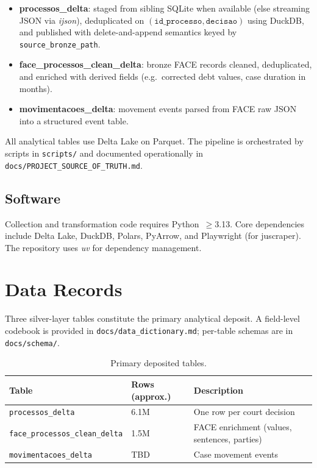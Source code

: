 \documentclass[11pt,a4paper]{article}
\begin{document}
\begin{itemize}
  \item \textbf{processos\_delta}: staged from sibling SQLite when available (else streaming JSON via \emph{ijson}), deduplicated on \((\texttt{id\_processo}, \texttt{decisao})\) using DuckDB, and published with delete-and-append semantics keyed by \texttt{source\_bronze\_path}.
  \item \textbf{face\_processos\_clean\_delta}: bronze FACE records cleaned, deduplicated, and enriched with derived fields (e.g.\ corrected debt values, case duration in months).
  \item \textbf{movimentacoes\_delta}: movement events parsed from FACE raw JSON into a structured event table.
\end{itemize}

All analytical tables use Delta Lake on Parquet. The pipeline is orchestrated by scripts in \texttt{scripts/} and documented operationally in \texttt{docs/PROJECT\_SOURCE\_OF\_TRUTH.md}.

\subsection*{Software}

Collection and transformation code requires Python~$\geq$3.13. Core dependencies include Delta Lake, DuckDB, Polars, PyArrow, and Playwright (for juscraper). The repository uses \emph{uv} for dependency management.

\section*{Data Records}

Three silver-layer tables constitute the primary analytical deposit. A field-level codebook is provided in \texttt{docs/data\_dictionary.md}; per-table schemas are in \texttt{docs/schema/}.

\begin{table}[htbp]
  \centering
  \caption{Primary deposited tables.}
  \label{tab:tables}
  \begin{tabular}{@{}lll@{}}
    \toprule
    Table & Rows (approx.) & Description \\
    \midrule
    \texttt{processos\_delta} & 6.1M & One row per court decision \\
    \texttt{face\_processos\_clean\_delta} & 1.5M & FACE enrichment (values, sentences, parties) \\
    \texttt{movimentacoes\_delta} & TBD & Case movement events \\
    \bottomrule
  \end{tabular}
\end{table}
\end{document}
